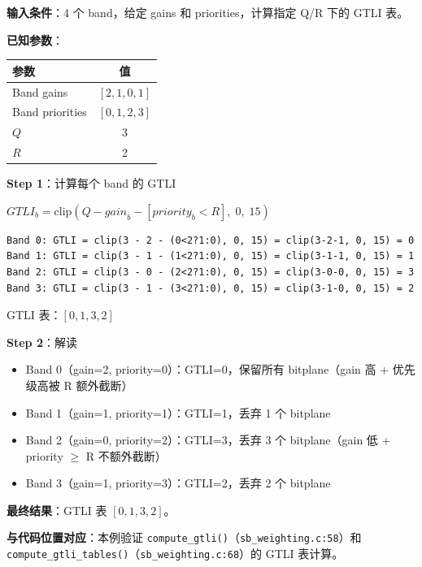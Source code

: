 \begin{examplebox}[title={例 3：GTLI 表计算}]

\textbf{输入条件}：4 个 band，给定 gains 和 priorities，计算指定 Q/R 下的 GTLI 表。

\medskip
\textbf{已知参数}：

\begin{tabular}{@{}lc@{}}
\toprule
参数 & 值 \\
\midrule
Band gains & $[2, 1, 0, 1]$ \\
Band priorities & $[0, 1, 2, 3]$ \\
$Q$ & 3 \\
$R$ & 2 \\
\bottomrule
\end{tabular}

\medskip
\textbf{Step 1}：计算每个 band 的 GTLI

$\mathit{GTLI}_b = \mathrm{clip}(Q - \mathit{gain}_b - [\mathit{priority}_b < R],\; 0,\; 15)$

\begin{lstlisting}[numbers=none]
Band 0: GTLI = clip(3 - 2 - (0<2?1:0), 0, 15) = clip(3-2-1, 0, 15) = 0
Band 1: GTLI = clip(3 - 1 - (1<2?1:0), 0, 15) = clip(3-1-1, 0, 15) = 1
Band 2: GTLI = clip(3 - 0 - (2<2?1:0), 0, 15) = clip(3-0-0, 0, 15) = 3
Band 3: GTLI = clip(3 - 1 - (3<2?1:0), 0, 15) = clip(3-1-0, 0, 15) = 2
\end{lstlisting}

GTLI 表：$[0, 1, 3, 2]$

\textbf{Step 2}：解读
\begin{itemize}
  \item Band 0（gain=2, priority=0）：GTLI=0，保留所有 bitplane（gain 高 + 优先级高被 R 额外截断）
  \item Band 1（gain=1, priority=1）：GTLI=1，丢弃 1 个 bitplane
  \item Band 2（gain=0, priority=2）：GTLI=3，丢弃 3 个 bitplane（gain 低 + priority $\geq$ R 不额外截断）
  \item Band 3（gain=1, priority=3）：GTLI=2，丢弃 2 个 bitplane
\end{itemize}

\medskip
\textbf{最终结果}：GTLI 表 $[0, 1, 3, 2]$。

\medskip
\textbf{与代码位置对应}：本例验证 \texttt{compute\_gtli()}（\texttt{sb\_weighting.c:58}）和 \texttt{compute\_gtli\_tables()}（\texttt{sb\_weighting.c:68}）的 GTLI 表计算。
\end{examplebox}

